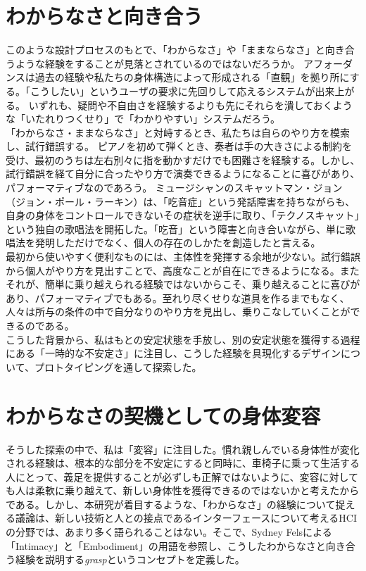 \section*{わからなさと向き合う}
このような設計プロセスのもとで、「わからなさ」や「ままならなさ」と向き合うような経験をすることが見落とされているのではないだろうか。
アフォーダンスは過去の経験や私たちの身体構造によって形成される「直観」を拠り所にする。「こうしたい」というユーザの要求に先回りして応えるシステムが出来上がる。
いずれも、疑問や不自由さを経験するよりも先にそれらを潰しておくような「いたれりつくせり」で「わかりやすい」システムだろう。\\
「わからなさ・ままならなさ」と対峙するとき、私たちは自らのやり方を模索し、試行錯誤する。
ピアノを初めて弾くとき、奏者は手の大きさによる制約を受け、最初のうちは左右別々に指を動かすだけでも困難さを経験する。しかし、試行錯誤を経て自分に合ったやり方で演奏できるようになることに喜びがあり、パフォーマティブなのであろう。
ミュージシャンのスキャットマン・ジョン（ジョン・ポール・ラーキン）は、「吃音症」という発話障害を持ちながらも、自身の身体をコントロールできないその症状を逆手に取り、「テクノスキャット」という独自の歌唱法を開拓した。「吃音」という障害と向き合いながら、単に歌唱法を発明しただけでなく、個人の存在のしかたを創造したと言える。\\
最初から使いやすく便利なものには、主体性を発揮する余地が少ない。試行錯誤から個人がやり方を見出すことで、高度なことが自在にできるようになる。またそれが、簡単に乗り越えられる経験ではないからこそ、乗り越えることに喜びがあり、パフォーマティブでもある。至れり尽くせりな道具を作るまでもなく、人々は所与の条件の中で自分なりのやり方を見出し、乗りこなしていくことができるのである。\\
こうした背景から、私はもとの安定状態を手放し、別の安定状態を獲得する過程にある「一時的な不安定さ」に注目し、こうした経験を具現化するデザインについて、プロトタイピングを通して探索した。

\section*{わからなさの契機としての身体変容}
そうした探索の中で、私は「変容」に注目した。慣れ親しんでいる身体性が変化される経験は、根本的な部分を不安定にすると同時に、車椅子に乗って生活する人にとって、義足を提供することが必ずしも正解ではないように、変容に対しても人は柔軟に乗り越えて、新しい身体性を獲得できるのではないかと考えたからである。しかし、本研究が着目するような、「わからなさ」の経験について捉える議論は、新しい技術と人との接点であるインターフェースについて考えるHCIの分野では、あまり多く語られることはない。そこで、Sydney Felsによる「Intimacy」と「Embodiment」の用語を参照し、こうしたわからなさと向き合う経験を説明する\textit{grasp}というコンセプトを定義した。

